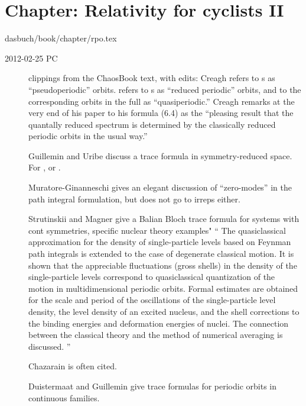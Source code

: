 %
%
%
%
\section{Chapter: Relativity for cyclists II}
\label{c-rpo}\noindent dasbuch/book/chapter/rpo.tex

\begin{description}
\item[2012-02-25 PC] clippings from the ChaosBook text, with edits:             \toCB
Creagh refers to \rpo s as ``pseudoperiodic'' orbits.
  refers to \rpo s as ``reduced periodic'' orbits, and
to the corresponding orbits in the full {\statesp} as ``quasiperiodic.''
Creagh remarks at the very end of his paper to his formula (6.4) as the
``pleasing result that the quantally reduced spectrum is determined by
the classically reduced periodic orbits in the usual way.'' 

Guillemin and Uribe discuss a trace formula in
symmetry-reduced space. For 
, or
.

Muratore-Ginanneschi gives an elegant
discussion of ``zero-modes'' in the path integral formulation, but does
not go to irreps either.

Strutinskii and  Magner give a
Balian Bloch trace formula for systems with cont symmetries,
specific nuclear theory examples" ``
The quasiclassical approximation for the density of single-particle
levels based on {Feynman} path integrals is extended to the case of
degenerate classical motion. It is shown that the appreciable
fluctuations (gross shells) in the density of the single-particle levels
correspond to quasiclassical quantization of the motion in
multidimensional periodic orbits. Formal estimates are obtained for the
scale and period of the oscillations of the single-particle level
density, the level density of an excited nucleus, and the shell
corrections to the binding energies and deformation energies of nuclei.
The connection between the classical theory and the method of numerical
averaging is discussed.
''

Chazarain is often cited.


Duistermaat and Guillemin give
trace formulas for periodic orbits in continuous families.


\end{description}

